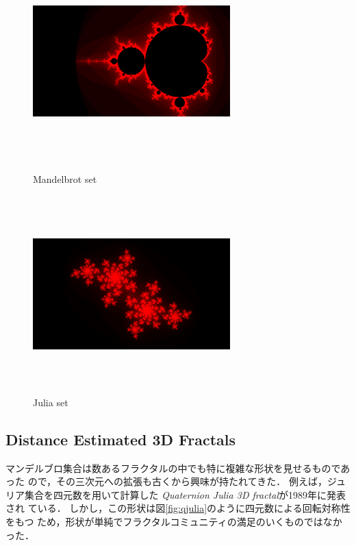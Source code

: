\begin{figure}[htbp]
 \begin{minipage}{0.49\hsize}
  \center
   \includegraphics[width=3in, height=3in, keepaspectratio]{../img/fractal/mandelbrot.pdf}
   \caption{Mandelbrot set}
   \label{fig:mandelbrot}
 \end{minipage}
 \begin{minipage}{0.49\hsize}
  \center
  \includegraphics[width=3in, height=3in, keepaspectratio]{../img/fractal/julia.pdf}
  \caption{Julia set}
  \label{fig:julia}
 \end{minipage}
\end{figure}

\subsection{Distance Estimated 3D Fractals}

マンデルブロ集合は数あるフラクタルの中でも特に複雑な形状を見せるものであった
ので，その三次元への拡張も古くから興味が持たれてきた．
例えば，ジュリア集合を四元数を用いて計算した
\textit{Quaternion Julia 3D fractal}\cite{hart1989ray}が1989年に発表され
ている．
しかし，この形状は図\ref{fig:qjulia}のように四元数による回転対称性をもつ
ため，形状が単純でフラクタルコミュニティの満足のいくものではなかった．

